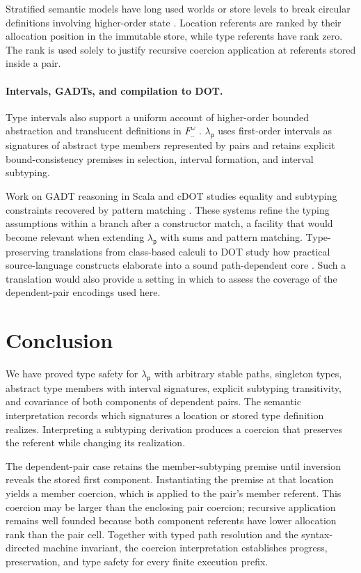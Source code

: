 \documentclass[acmsmall,screen,nonacm]{acmart}
\newcommand{\lambdap}{\ensuremath{\lambda_{\mathsf p}}}
\begin{document}
Stratified semantic models have long used worlds or store levels to break
circular definitions involving higher-order state
\citep{ahmed2002stratified}. Location referents are ranked by their allocation
position in the immutable store, while type referents have rank zero. The
rank is used solely to justify recursive coercion application at referents
stored inside a pair.

\paragraph{Intervals, GADTs, and compilation to DOT.}
Type intervals also support a uniform account of higher-order bounded
abstraction and translucent definitions in
\(F^{\omega}_{..}\) \citep{stucki2021intervals}. \lambdap{} uses first-order
intervals as signatures of abstract type members represented by pairs and
retains explicit bound-consistency premises in selection, interval formation,
and interval subtyping.

Work on GADT reasoning in Scala and cDOT studies equality and subtyping
constraints recovered by pattern matching
\citep{parreaux2019gadt,boruchgruszecki2022cdot}. These systems refine the
typing assumptions within a branch after a constructor match, a facility that
would become relevant when extending \lambdap{} with sums and pattern
matching. Type-preserving translations from class-based calculi to DOT study
how practical source-language constructs elaborate into a sound
path-dependent core \citep{martres2023compilation}. Such a translation would
also provide a setting in which to assess the coverage of the dependent-pair
encodings used here.

\section{Conclusion}

We have proved type safety for \lambdap{} with arbitrary stable paths,
singleton types, abstract type members with interval signatures, explicit
subtyping transitivity, and covariance of both components of dependent pairs.
The semantic interpretation records which signatures a location or stored
type definition realizes. Interpreting a subtyping derivation produces a
coercion that preserves the referent while changing its realization.

The dependent-pair case retains the member-subtyping premise until inversion
reveals the stored first component. Instantiating the premise at that location
yields a member coercion, which is applied to the pair's member referent. This
coercion may be larger than the enclosing pair coercion; recursive application
remains well founded because both component referents have lower allocation
rank than the pair cell. Together with typed path resolution and the
syntax-directed machine invariant, the coercion interpretation establishes
progress, preservation, and type safety for every finite execution prefix.



\end{document}

